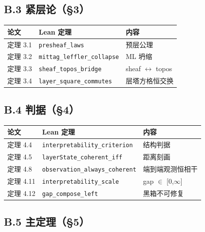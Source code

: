 \documentclass[11pt,a4paper]{ctexart}
\begin{document}
\subsection{B.3 紧层论（§3）}

\begin{center}\small
\begin{tabular}{lll}
\toprule
论文 & Lean 定理 & 内容 \\
\midrule
定理 3.1 & \texttt{presheaf\_laws} & 预层公理 \\
定理 3.2 & \texttt{mittag\_leffler\_collapse} & ML 坍缩 \\
定理 3.3 & \texttt{sheaf\_topos\_bridge} & sheaf \ensuremath{\leftrightarrow} topos \\
定理 3.4 & \texttt{layer\_square\_commutes} & 层塔方格恒交换 \\
\bottomrule
\end{tabular}
\end{center}

\subsection{B.4 判据（§4）}

\begin{center}\small
\begin{tabular}{lll}
\toprule
论文 & Lean 定理 & 内容 \\
\midrule
定理 4.4 & \texttt{interpretability\_criterion} & 结构判据 \\
定理 4.5 & \texttt{layerState\_coherent\_iff} & 距离刻画 \\
定理 4.8 & \texttt{observation\_always\_coherent} & 端到端观测恒相干 \\
定理 4.11 & \texttt{interpretability\_scale} & gap \ensuremath{\in} [0,\ensuremath{\infty}] \\
定理 4.12 & \texttt{gap\_compose\_left} & 黑箱不可修复 \\
\bottomrule
\end{tabular}
\end{center}

\subsection{B.5 主定理（§5）}
\end{document}

